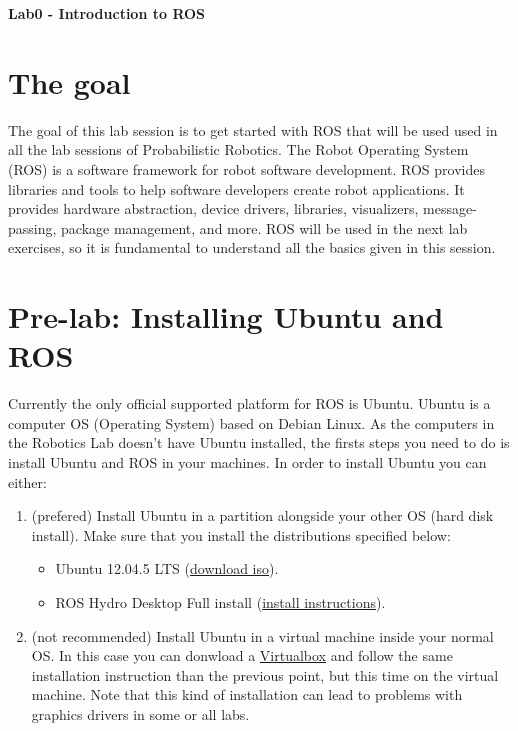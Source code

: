 \documentclass[a4paper,10pt]{article}
\begin{document}
\marginsize{2cm}{2cm}{2cm}{2cm}

\begin{center}
\Large \textbf{Lab0 - Introduction to ROS}
\end{center}

\section{The goal}

The goal of this lab session is to get started with ROS that will be used used in all the lab sessions of Probabilistic Robotics. The Robot Operating System (ROS) is a software framework for robot software development. ROS provides libraries and tools to help software developers create robot applications. It provides hardware abstraction, device drivers, libraries, visualizers, message-passing, package management, and more. ROS will be used in the next lab exercises, so it is fundamental to understand all the basics given in this session. 

\section{Pre-lab: Installing Ubuntu and ROS}

Currently the only official supported platform for ROS is Ubuntu. Ubuntu is a computer OS (Operating System) based on Debian Linux. As the computers in the Robotics Lab doesn't have Ubuntu installed, the firsts steps you need to do is install Ubuntu and ROS in your machines. In order to install Ubuntu you can either:

\begin{enumerate}
    \item (prefered) Install Ubuntu in a partition alongside your other OS (hard disk install). Make sure that you install the distributions specified below:
    \begin{itemize}
        \item Ubuntu 12.04.5 LTS (\href{http://releases.ubuntu.com/12.04/ubuntu-12.04.5-desktop-amd64.iso}{download iso}).
        \item ROS Hydro Desktop Full install (\href{http://wiki.ros.org/hydro/Installation/Ubuntu}{install instructions}).
    \end{itemize}
    
    \item (not recommended) Install Ubuntu in a virtual machine inside your normal OS. In this case you can donwload a \href{https://www.virtualbox.org/wiki/Linux_Downloads}{Virtualbox}  and follow the same installation instruction than the previous point, but this time on the virtual machine. Note that this kind of installation can lead to problems with graphics drivers in some or all labs.
\end{enumerate}
\end{document}
